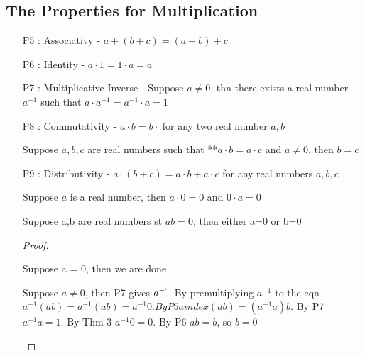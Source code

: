\documentclass{report}
\begin{document}
    \subsection*{The Properties for Multiplication}%
      \begin{enumerate}
        \item[P5]: Associativy - $a + (b+c) = (a+b)+c$
        \item[P6]: Identity - $a \cdot 1 = 1 \cdot a = a$
        \item[P7]: Multiplicative Inverse - Suppose $a \neq 0$, thn
          there exists a real number $a^{-1}$ such that
          $a \cdot a^{-1} = a^{-1} \cdot a = 1$
        \item[P8]: Commutativity - $a \cdot b = b \cdot$
          for any two real number $a,b$

       {
        Suppose $a,b,c$ are real numbers such that {**}$a \cdot b=a \cdot c$
        and $a \neq 0$, then $b = c$
      }

        \item[P9]: Distributivity -
          $a \cdot (b +c) = a \cdot b  + a \cdot c$
          for any real numbers $a,b,c$

           {
            Suppose $a$ is a real number, then $a \cdot 0 = 0$ and
            $0 \cdot a = 0$
          }

       {
        Suppose a,b are real numbers st $ab=0$, then either a=0 or b=0
      }
      \begin{proof}
        \begin{case}
          Suppose a = 0, then we are done
        \end{case}
        \begin{case}
          Suppose $a \neq 0$, then P7 gives $a^{-`}$.
          By premultiplying $a^{-1}$ to the eqn
          $a^{-1}(a b) = a^{-1}(ab) = a ^{-1}0.
          By P5 a index(ab) = (a ^{-1} a) b$.  By P7 $a ^{-1} a = 1$.
          By Thm 3 $a ^{-1} 0 = 0$.  By P6 $a b = b$, so $b=0$


\end{case}
\end{proof}
\end{enumerate}
\end{document}

